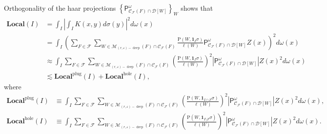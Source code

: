 \documentclass{amsart}%
\theoremstyle{plain}
\numberwithin{equation}{section}
\begin{document}
Orthogonality of the haar projections $\left\{  \mathsf{P}_{\mathcal{C}%
_{\mathcal{F}}\left(  F\right)  \cap\mathcal{D}\left[  W\right]  }^{\omega
}\right\}  _{W}$ shows that%
\begin{align*}
\mathbf{Local}\left(  I\right)    & =\int_{I}\left\vert \int_{I}K\left(
x,y\right)  d\sigma\left(  y\right)  \right\vert ^{2}d\omega\left(  x\right)
\\
& =\int_{I}\left(  \sum_{F\in\mathcal{F}}\sum_{W\in\mathcal{M}_{\left(
r,\varepsilon\right)  -\operatorname*{deep}}\left(  F\right)  \cap
\mathcal{C}_{\mathcal{F}}\left(  F\right)  }\frac{\mathrm{P}\left(
W,\mathbf{1}_{I}\sigma\right)  }{\ell\left(  W\right)  }\mathsf{P}%
_{\mathcal{C}_{\mathcal{F}}\left(  F\right)  \cap\mathcal{D}\left[  W\right]
}^{\omega}Z\left(  x\right)  \right)  ^{2}d\omega\left(  x\right)  \\
& \approx\int_{I}\sum_{F\in\mathcal{F}}\sum_{W\in\mathcal{M}_{\left(
r,\varepsilon\right)  -\operatorname*{deep}}\left(  F\right)  \cap
\mathcal{C}_{\mathcal{F}}\left(  F\right)  }\left(  \frac{\mathrm{P}\left(
W,\mathbf{1}_{I}\sigma\right)  }{\ell\left(  W\right)  }\right)
^{2}\left\vert \mathsf{P}_{\mathcal{C}_{\mathcal{F}}\left(  F\right)
\cap\mathcal{D}\left[  W\right]  }^{\omega}\right\vert Z\left(  x\right)
^{2}d\omega\left(  x\right)  \\
& \lesssim\mathbf{Local}^{\operatorname{plug}}\left(  I\right)
+\mathbf{Local}^{\operatorname{hole}}\left(  I\right)  ,
\end{align*}
where%
\begin{align*}
\mathbf{Local}^{\operatorname{plug}}\left(  I\right)    & \equiv\int_{I}%
\sum_{F\in\mathcal{F}}\sum_{W\in\mathcal{M}_{\left(  r,\varepsilon\right)
-\operatorname*{deep}}\left(  F\right)  \cap\mathcal{C}_{\mathcal{F}}\left(
F\right)  }\left(  \frac{\mathrm{P}\left(  W,\mathbf{1}_{I\cap F}%
\sigma\right)  }{\ell\left(  W\right)  }\right)  ^{2}\left\vert \mathsf{P}%
_{\mathcal{C}_{\mathcal{F}}\left(  F\right)  \cap\mathcal{D}\left[  W\right]
}^{\omega}\right\vert Z\left(  x\right)  ^{2}d\omega\left(  x\right)  ,\\
\mathbf{Local}^{\operatorname{hole}}\left(  I\right)    & \equiv\int_{I}%
\sum_{F\in\mathcal{F}}\sum_{W\in\mathcal{M}_{\left(  r,\varepsilon\right)
-\operatorname*{deep}}\left(  F\right)  \cap\mathcal{C}_{\mathcal{F}}\left(
F\right)  }\left(  \frac{\mathrm{P}\left(  W,\mathbf{1}_{I\setminus F}%
\sigma\right)  }{\ell\left(  W\right)  }\right)  ^{2}\left\vert \mathsf{P}%
_{\mathcal{C}_{\mathcal{F}}\left(  F\right)  \cap\mathcal{D}\left[  W\right]
}^{\omega}\right\vert Z\left(  x\right)  ^{2}d\omega\left(  x\right)  .
\end{align*}
\end{document}
